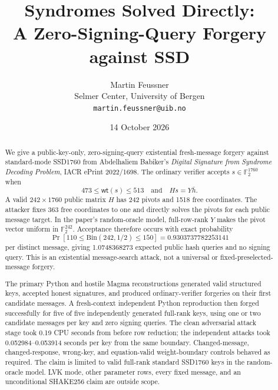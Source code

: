 \documentclass[10pt,a4paper]{article}
\title{\bfseries Syndromes Solved Directly:\\
A Zero-Signing-Query Forgery against SSD}
\author{Martin Feussner\\
\small Selmer Center, University of Bergen\\
\small \texttt{martin.feussner@uib.no}}
\date{14 October 2026}
\newcommand{\F}{\mathbb{F}}
\newcommand{\wt}{\mathsf{wt}}
\begin{document}
\maketitle

\noindent{}

\begin{abstract}
We give a public-key-only, zero-signing-query existential fresh-message forgery
against standard-mode SSD1760 from Abdelhaliem Babiker's \emph{Digital
Signature from Syndrome Decoding Problem}, IACR ePrint 2022/1698. The ordinary
verifier accepts $s\in\F_2^{1760}$ when
\[
  473\leq\wt(s)\leq513
  \quad\text{and}\quad
  Hs=Y\bar h.
\]
A valid $242\times1760$ public matrix $H$ has 242 pivots and 1518 free
coordinates. The attacker fixes 363 free coordinates to one and directly
solves the pivots for each public message target. In the paper's random-oracle
model, full-row-rank $Y$ makes the pivot vector uniform in $\F_2^{242}$.
Acceptance therefore occurs with exact probability
\[
  \Pr[110\leq\mathrm{Bin}(242,1/2)\leq150]
  =0.9303737782253141
\]
per distinct message, giving 1.0748368273 expected public hash queries and no
signing query. This is an existential message-search attack, not a universal
or fixed-preselected-message forgery.

The primary Python and hostile Magma reconstructions generated valid structured
keys, accepted honest signatures, and produced ordinary-verifier forgeries on
their first candidate messages. A fresh-context independent Python
reproduction then forged successfully for five of five independently generated
full-rank keys, using one or two candidate messages per key and zero signing
queries. The clean adversarial attack stage took 0.19 CPU seconds from before
row reduction; the independent attacks took 0.052984--0.053914 seconds per key
from the same boundary. Changed-message, changed-response, wrong-key, and
equation-valid weight-boundary controls behaved as required. The claim is
limited to valid full-rank standard SSD1760 keys in the random-oracle model.
LVK mode, other parameter rows, every fixed message, and an unconditional
SHAKE256 claim are outside scope.
\end{abstract}
\end{document}
